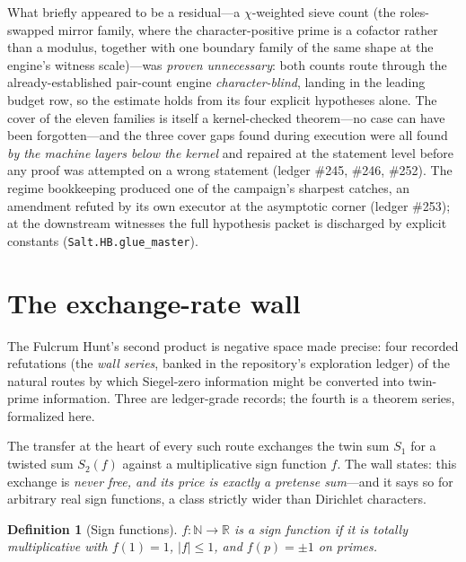 \documentclass{CUP-JNL-FMP}
\newcommand{\leanname}[1]{\par\noindent{\small\texttt{#1}}}
\newcommand{\leaninline}[1]{{\small\texttt{#1}}}
\newtheorem{definition}[theorem]{Definition}
\theoremstyle{remark}
\begin{document}
What briefly appeared to be a residual---a $\chi$-weighted sieve count
(the roles-swapped mirror family, where the character-positive prime is a
cofactor rather than a modulus, together with one boundary family of the
same shape at the engine's witness scale)---was \emph{proven
unnecessary}: both counts route through the already-established
pair-count engine \emph{character-blind}, landing in the leading budget
row, so the estimate holds from its four explicit hypotheses alone. The
cover of the eleven families is itself a kernel-checked theorem---no case
can have been forgotten---and the three cover gaps found during execution
were all found \emph{by the machine layers below the kernel} and repaired
at the statement level before any proof was attempted on a wrong
statement (ledger \#245, \#246, \#252). The regime bookkeeping produced
one of the campaign's sharpest catches, an amendment refuted by its own
executor at the asymptotic corner (ledger \#253); at the downstream
witnesses the full hypothesis packet is discharged by explicit constants
(\leaninline{Salt.HB.glue\_master}).

\section{The exchange-rate wall}\label{sec:walls}

The Fulcrum Hunt's second product is negative space made precise: four
recorded refutations (the \emph{wall series}, banked in the repository's
exploration ledger) of the natural routes by which Siegel-zero
information might be converted into twin-prime information. Three are
ledger-grade records; the fourth is a theorem series, formalized here.

The transfer at the heart of every such route exchanges the twin sum
$S_1$ for a twisted sum $S_2(f)$ against a multiplicative sign function
$f$. The wall states: this exchange is \emph{never free, and its price is
exactly a pretense sum}---and it says so for arbitrary real sign
functions, a class strictly wider than Dirichlet characters.

\begin{definition}[Sign functions]\label{def:sign}
$f : \mathbb{N} \to \mathbb{R}$ is a \emph{sign function} if it is
totally multiplicative with $f(1)=1$, $|f| \le 1$, and $f(p) = \pm 1$ on
primes.
\leanname{Salt.HB.IsSignFunction}
\end{definition}
\end{document}
